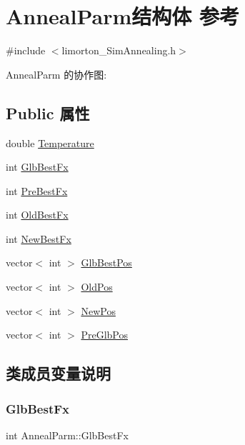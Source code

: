 \hypertarget{struct_anneal_parm}{}\section{Anneal\+Parm结构体 参考}
\label{struct_anneal_parm}


{\ttfamily \#include $<$limorton\+\_\+\+Sim\+Annealing.\+h$>$}



Anneal\+Parm 的协作图\+:
\subsection*{Public 属性}
\begin{DoxyCompactItemize}
\item 
double \hyperlink{struct_anneal_parm_a83cf17c2d3988dc95830cf8ec6b3a2ee}{Temperature}
\item 
int \hyperlink{struct_anneal_parm_a26fb71328c7d36858ebff1be50599323}{Glb\+Best\+Fx}
\item 
int \hyperlink{struct_anneal_parm_a525ed00840a1041d36800f469e263957}{Pre\+Best\+Fx}
\item 
int \hyperlink{struct_anneal_parm_a2e473bc2c64c7425cfd8eaddc4d23b49}{Old\+Best\+Fx}
\item 
int \hyperlink{struct_anneal_parm_a0c70bd68a708b982ee5f4a31e151c869}{New\+Best\+Fx}
\item 
vector$<$ int $>$ \hyperlink{struct_anneal_parm_a59dd088b737e56a085280d0134e66b10}{Glb\+Best\+Pos}
\item 
vector$<$ int $>$ \hyperlink{struct_anneal_parm_a5d25451fdda9b780832f8cc11305a599}{Old\+Pos}
\item 
vector$<$ int $>$ \hyperlink{struct_anneal_parm_a20c30705b04aa17005873b9784b65f93}{New\+Pos}
\item 
vector$<$ int $>$ \hyperlink{struct_anneal_parm_ab347e013d216e0d8f1f6c1db4a720ac4}{Pre\+Glb\+Pos}
\end{DoxyCompactItemize}


\subsection{类成员变量说明}
\mbox{\label{struct_anneal_parm_a26fb71328c7d36858ebff1be50599323}} 
\subsubsection{\texorpdfstring{Glb\+Best\+Fx}{GlbBestFx}}
{\footnotesize\ttfamily int Anneal\+Parm\+::\+Glb\+Best\+Fx}

